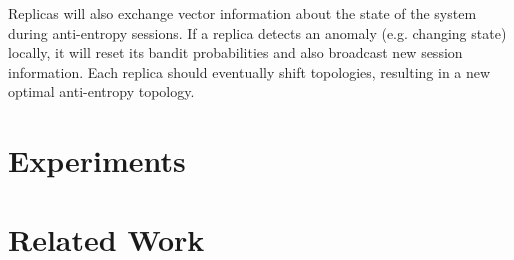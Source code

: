 \documentclass[letterpaper,11pt,onecolumn]{article}
\begin{document}
Replicas will also exchange vector information about the state of the system
during anti-entropy sessions.
If a replica detects an anomaly (e.g. changing state) locally, it will reset
its bandit probabilities and also broadcast new session information.
Each replica should eventually shift topologies, resulting in a new optimal
anti-entropy topology.

\section*{Experiments}

\section*{Related Work}

\newpage


\end{document}
